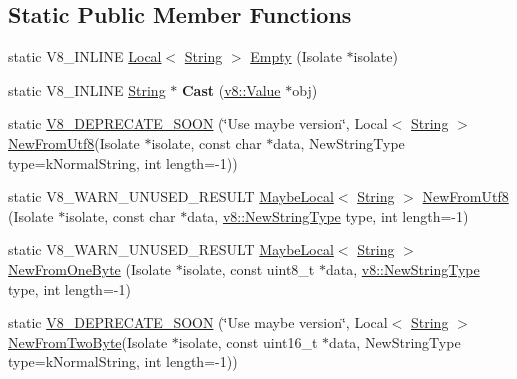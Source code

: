 \subsection*{Static Public Member Functions}
\begin{DoxyCompactItemize}
\item 
static V8\+\_\+\+I\+N\+L\+I\+NE \mbox{\hyperlink{classv8_1_1Local}{Local}}$<$ \mbox{\hyperlink{classv8_1_1String}{String}} $>$ \mbox{\hyperlink{classv8_1_1String_aa393d47baa54467fe57001065e49194b}{Empty}} (Isolate $\ast$isolate)
\item 
\mbox{\label{classv8_1_1String_a826d60798dc152cea64a7636737b03b9}} 
static V8\+\_\+\+I\+N\+L\+I\+NE \mbox{\hyperlink{classv8_1_1String}{String}} $\ast$ {\bfseries Cast} (\mbox{\hyperlink{classv8_1_1Value}{v8\+::\+Value}} $\ast$obj)
\item 
static \mbox{\hyperlink{classv8_1_1String_aa9d64688e3535b3daabafcc46a59ce5a}{V8\+\_\+\+D\+E\+P\+R\+E\+C\+A\+T\+E\+\_\+\+S\+O\+ON}} (\char`\"{}Use maybe version\char`\"{}, Local$<$ \mbox{\hyperlink{classv8_1_1String}{String}} $>$ \mbox{\hyperlink{classv8_1_1String_a851bcf20fecb01b97f14131ce609f701}{New\+From\+Utf8}}(Isolate $\ast$isolate, const char $\ast$data, New\+String\+Type type=k\+Normal\+String, int length=-\/1))
\item 
static V8\+\_\+\+W\+A\+R\+N\+\_\+\+U\+N\+U\+S\+E\+D\+\_\+\+R\+E\+S\+U\+LT \mbox{\hyperlink{classv8_1_1MaybeLocal}{Maybe\+Local}}$<$ \mbox{\hyperlink{classv8_1_1String}{String}} $>$ \mbox{\hyperlink{classv8_1_1String_a851bcf20fecb01b97f14131ce609f701}{New\+From\+Utf8}} (Isolate $\ast$isolate, const char $\ast$data, \mbox{\hyperlink{namespacev8_ac9163ab12fb3b2a95907a3a0367c6095}{v8\+::\+New\+String\+Type}} type, int length=-\/1)
\item 
static V8\+\_\+\+W\+A\+R\+N\+\_\+\+U\+N\+U\+S\+E\+D\+\_\+\+R\+E\+S\+U\+LT \mbox{\hyperlink{classv8_1_1MaybeLocal}{Maybe\+Local}}$<$ \mbox{\hyperlink{classv8_1_1String}{String}} $>$ \mbox{\hyperlink{classv8_1_1String_a2b8cf518523a62d97360c07ed33d8aa6}{New\+From\+One\+Byte}} (Isolate $\ast$isolate, const uint8\+\_\+t $\ast$data, \mbox{\hyperlink{namespacev8_ac9163ab12fb3b2a95907a3a0367c6095}{v8\+::\+New\+String\+Type}} type, int length=-\/1)
\item 
static \mbox{\hyperlink{classv8_1_1String_aeab948105979e2ffd61eb552b0da4e50}{V8\+\_\+\+D\+E\+P\+R\+E\+C\+A\+T\+E\+\_\+\+S\+O\+ON}} (\char`\"{}Use maybe version\char`\"{}, Local$<$ \mbox{\hyperlink{classv8_1_1String}{String}} $>$ \mbox{\hyperlink{classv8_1_1String_aaad4c7c856c29d79db85994c301fe601}{New\+From\+Two\+Byte}}(Isolate $\ast$isolate, const uint16\+\_\+t $\ast$data, New\+String\+Type type=k\+Normal\+String, int length=-\/1))

\end{DoxyCompactItemize}

